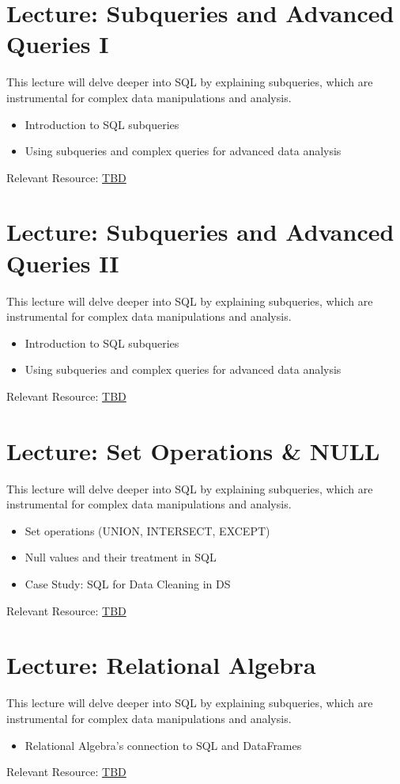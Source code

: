 \documentclass[11pt, letterpaper]{article}
\let\oldsection\section
\renewcommand\section{\clearpage\oldsection}
\begin{document}
	\section*{Lecture: Subqueries and Advanced Queries I}
	This lecture will delve deeper into SQL by explaining subqueries, which are instrumental for complex data manipulations and analysis.
	\begin{itemize}
		\item Introduction to SQL subqueries
		\item Using subqueries and complex queries for advanced data analysis
	\end{itemize}
	Relevant Resource: \href{https://example.com}{TBD}
	
	\section*{Lecture: Subqueries and Advanced Queries II}
	This lecture will delve deeper into SQL by explaining subqueries, which are instrumental for complex data manipulations and analysis.
	\begin{itemize}
		\item Introduction to SQL subqueries
		\item Using subqueries and complex queries for advanced data analysis
	\end{itemize}
	Relevant Resource: \href{https://example.com}{TBD}
	
	\section*{Lecture: Set Operations \& NULL}
	This lecture will delve deeper into SQL by explaining subqueries, which are instrumental for complex data manipulations and analysis.
	\begin{itemize}
		\item Set operations (UNION, INTERSECT, EXCEPT)
		\item Null values and their treatment in SQL
		\item Case Study: SQL for Data Cleaning in DS
	\end{itemize}
	Relevant Resource: \href{https://example.com}{TBD}
	
	\section*{Lecture: Relational Algebra}
	This lecture will delve deeper into SQL by explaining subqueries, which are instrumental for complex data manipulations and analysis.
	\begin{itemize}
		\item Relational Algebra's connection to SQL and DataFrames
	\end{itemize}
	Relevant Resource: \href{https://example.com}{TBD}
	
\end{document}
